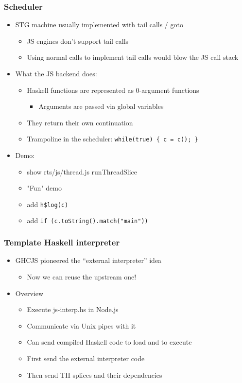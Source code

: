 \documentclass{beamer}
\begin{document}
\begin{frame}
\frametitle{Scheduler}
  \begin{itemize}
    \item STG machine usually implemented with tail calls / goto
      \begin{itemize}
        \item JS engines don't support tail calls
        \item Using normal calls to implement tail calls would blow the JS call
          stack
      \end{itemize}

    \item What the JS backend does:
      \begin{itemize}
        \item Haskell functions are represented as 0-argument functions
          \begin{itemize}
            \item Arguments are passed via global variables
          \end{itemize}
        \item They \alert{return} their own continuation
        \item Trampoline in the scheduler: \texttt{while(true) \{ c = c(); \}}
      \end{itemize}
    \item Demo:
      \begin{itemize}
        \item show rts/js/thread.js runThreadSlice
        \item "Fun" demo
        \item add \texttt{h\$log(c)}
        \item add \texttt{if (c.toString().match("main"))}
      \end{itemize}
  \end{itemize}
\end{frame}

\begin{frame}
\frametitle{Template Haskell interpreter}
  \begin{itemize}
    \item GHCJS pioneered the “external interpreter” idea
      \begin{itemize}
        \item Now we can reuse the upstream one!
      \end{itemize}
    \item Overview
      \begin{itemize}
    \item Execute js-interp.hs in Node.js
    \item Communicate via Unix pipes with it
    \item Can send compiled Haskell code to load and to execute
    \item First send the external interpreter code
    \item Then send TH splices and their dependencies
      \end{itemize}
  \end{itemize}
\end{frame}
\end{document}
